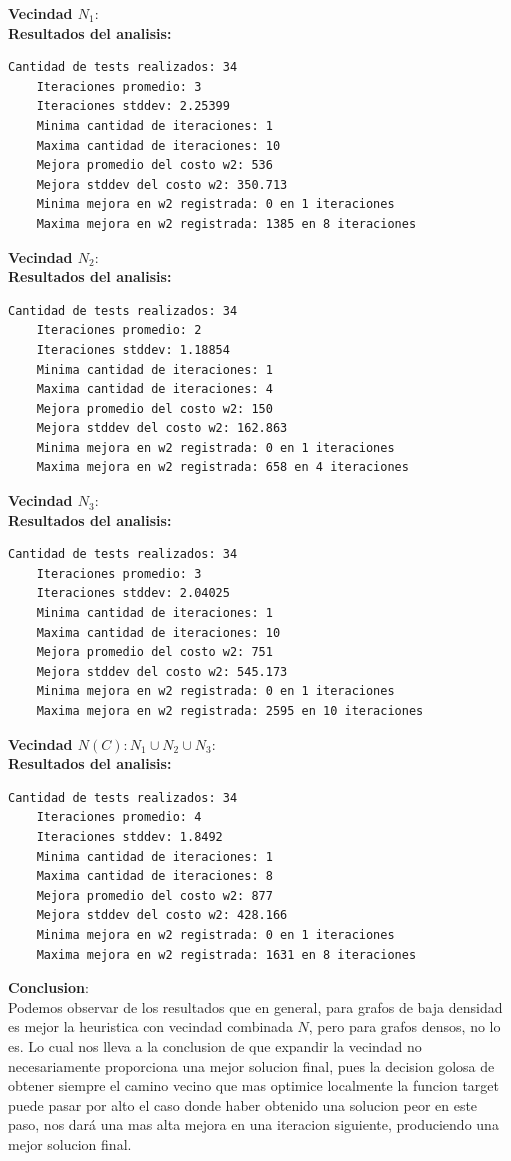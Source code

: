 \textbf{Vecindad $N_1$}:\\%
\textbf{Resultados del analisis:}
\begin{lstlisting}[frame=single]
	Cantidad de tests realizados: 34
	Iteraciones promedio: 3
	Iteraciones stddev: 2.25399
	Minima cantidad de iteraciones: 1
	Maxima cantidad de iteraciones: 10
	Mejora promedio del costo w2: 536
	Mejora stddev del costo w2: 350.713
	Minima mejora en w2 registrada: 0 en 1 iteraciones
	Maxima mejora en w2 registrada: 1385 en 8 iteraciones
\end{lstlisting}

\textbf{Vecindad $N_2$}:\\%
\textbf{Resultados del analisis:}
\begin{lstlisting}[frame=single]
	Cantidad de tests realizados: 34
	Iteraciones promedio: 2
	Iteraciones stddev: 1.18854
	Minima cantidad de iteraciones: 1
	Maxima cantidad de iteraciones: 4
	Mejora promedio del costo w2: 150
	Mejora stddev del costo w2: 162.863
	Minima mejora en w2 registrada: 0 en 1 iteraciones
	Maxima mejora en w2 registrada: 658 en 4 iteraciones
\end{lstlisting}

\textbf{Vecindad $N_3$}:\\%
\textbf{Resultados del analisis:}
\begin{lstlisting}[frame=single]
	Cantidad de tests realizados: 34
	Iteraciones promedio: 3
	Iteraciones stddev: 2.04025
	Minima cantidad de iteraciones: 1
	Maxima cantidad de iteraciones: 10
	Mejora promedio del costo w2: 751
	Mejora stddev del costo w2: 545.173
	Minima mejora en w2 registrada: 0 en 1 iteraciones
	Maxima mejora en w2 registrada: 2595 en 10 iteraciones
\end{lstlisting}

\textbf{Vecindad $N(C): N_1 \cup N_2 \cup N_3$}:\\
\textbf{Resultados del analisis:}
\begin{lstlisting}[frame=single]
	Cantidad de tests realizados: 34
	Iteraciones promedio: 4
	Iteraciones stddev: 1.8492
	Minima cantidad de iteraciones: 1
	Maxima cantidad de iteraciones: 8
	Mejora promedio del costo w2: 877
	Mejora stddev del costo w2: 428.166
	Minima mejora en w2 registrada: 0 en 1 iteraciones
	Maxima mejora en w2 registrada: 1631 en 8 iteraciones
\end{lstlisting}

\vspace{1cm}
\textbf{Conclusion}:\\
Podemos observar de los resultados que en general, para grafos de baja densidad es mejor la heuristica con vecindad combinada $N$, pero para grafos densos, no lo es. Lo cual nos lleva a la conclusion de que expandir la vecindad no necesariamente proporciona una mejor solucion final, pues la decision golosa de obtener siempre el camino vecino que mas optimice localmente la funcion target puede pasar por alto el caso donde haber obtenido una solucion peor en este paso, nos dar\'a una mas alta mejora en una iteracion siguiente, produciendo una mejor solucion final.

